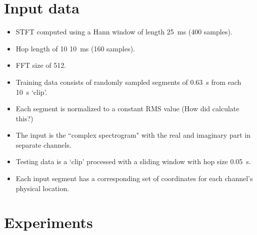 \documentclass[14pt]{extarticle}
\begin{document}
\section{Input data}

\begin{itemize}

\item STFT computed using a Hann window of length \SI{25}{\milli\second} (400 samples).

\item Hop length of 10 \SI{10}{\milli\second} (160 samples).

\item FFT size of 512. 

\item Training data consists of randomly sampled segments of \SI{0.63}{\second} from each \SI{10}{\second} `clip'. 

\item Each segment is normalized to a constant RMS value (How did \cite{gao2019visualsound} calculate this?)

\item The input is the ``complex spectrogram" with the real and imaginary part in separate channels. 

\item Testing data is a `clip' processed with a sliding window with hop size \SI{0.05}{\second}.

\item Each input segment has a corresponding set of coordinates for each channel's physical location.

\end{itemize}

\section{Experiments}
\end{document}
